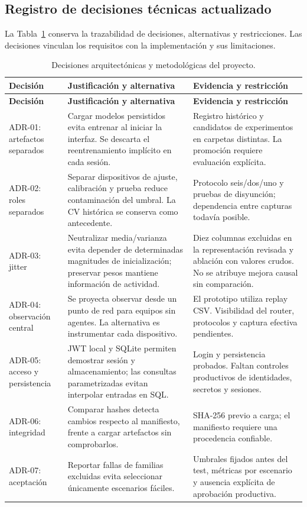 \documentclass[11pt,a4paper]{article}
\begin{document}
\subsection{Registro de decisiones técnicas actualizado}
La Tabla~\ref{tab:decisiones-tecnicas} conserva la trazabilidad de decisiones, alternativas y restricciones. Las decisiones vinculan los requisitos con la implementación y sus limitaciones.
\begin{longtable}{p{}p{}p{}}
\caption{Decisiones arquitectónicas y metodológicas del proyecto.}\label{tab:decisiones-tecnicas}\\
\toprule
\textbf{Decisión} & \textbf{Justificación y alternativa} & \textbf{Evidencia y restricción}\\
\midrule
\endfirsthead
\toprule
\textbf{Decisión} & \textbf{Justificación y alternativa} & \textbf{Evidencia y restricción}\\
\midrule
\endhead
ADR-01: artefactos separados & Cargar modelos persistidos evita entrenar al iniciar la interfaz. Se descarta el reentrenamiento implícito en cada sesión. & Registro histórico y candidatos de experimentos en carpetas distintas. La promoción requiere evaluación explícita.\\
\addlinespace
ADR-02: roles separados & Separar dispositivos de ajuste, calibración y prueba reduce contaminación del umbral. La CV histórica se conserva como antecedente. & Protocolo seis/dos/uno y pruebas de disyunción; dependencia entre capturas todavía posible.\\
\addlinespace
ADR-03: jitter & Neutralizar media/varianza evita depender de determinadas magnitudes de inicialización; preservar pesos mantiene información de actividad. & Diez columnas excluidas en la representación revisada y ablación con valores crudos. No se atribuye mejora causal sin comparación.\\
\addlinespace
ADR-04: observación central & Se proyecta observar desde un punto de red para equipos sin agentes. La alternativa es instrumentar cada dispositivo. & El prototipo utiliza replay CSV. Visibilidad del router, protocolos y captura efectiva pendientes.\\
\addlinespace
ADR-05: acceso y persistencia & JWT local y SQLite permiten demostrar sesión y almacenamiento; las consultas parametrizadas evitan interpolar entradas en SQL. & Login y persistencia probados. Faltan controles productivos de identidades, secretos y sesiones.\\
\addlinespace
ADR-06: integridad & Comparar hashes detecta cambios respecto al manifiesto, frente a cargar artefactos sin comprobarlos. & SHA-256 previo a carga; el manifiesto requiere una procedencia confiable.\\
\addlinespace
ADR-07: aceptación & Reportar fallas de familias excluidas evita seleccionar únicamente escenarios fáciles. & Umbrales fijados antes del test, métricas por escenario y ausencia explícita de aprobación productiva.\\
\bottomrule
\end{longtable}
\end{document}

